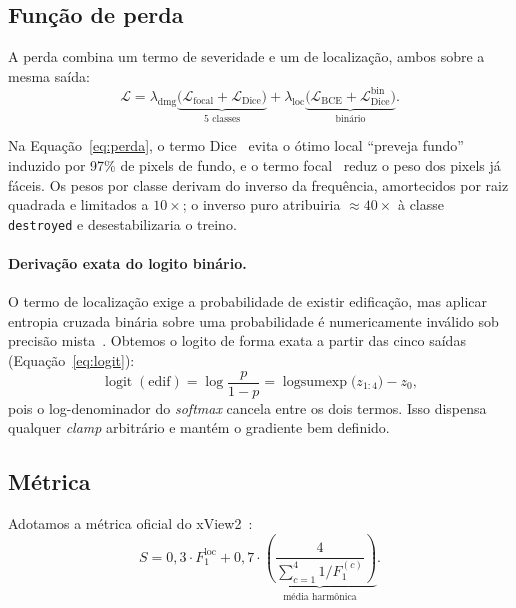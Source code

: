 \documentclass[11pt,a4paper]{article}
\begin{document}
\subsection{Função de perda}

A perda combina um termo de severidade e um de localização, ambos sobre a mesma
saída:
\begin{equation}
  \mathcal{L} = \lambda_{\text{dmg}}
      \underbrace{\big(\mathcal{L}_{\text{focal}} +
                       \mathcal{L}_{\text{Dice}}\big)}_{\text{5 classes}}
    + \lambda_{\text{loc}}
      \underbrace{\big(\mathcal{L}_{\text{BCE}} +
                       \mathcal{L}_{\text{Dice}}^{\text{bin}}\big)}_{\text{binário}} .
  \label{eq:perda}
\end{equation}

Na Equação~\ref{eq:perda}, o termo Dice~\cite{milletari2016} evita o ótimo local ``preveja fundo'' induzido
por 97\% de pixels de fundo, e o termo focal~\cite{lin2017focal} reduz o peso dos
pixels já fáceis. Os pesos por classe derivam do inverso da frequência,
amortecidos por raiz quadrada e limitados a $10\times$; o inverso puro atribuiria
$\approx 40\times$ à classe \texttt{destroyed} e desestabilizaria o treino.

\paragraph{Derivação exata do logito binário.} O termo de localização exige a
probabilidade de existir edificação, mas aplicar entropia cruzada binária sobre
uma probabilidade é numericamente inválido sob precisão mista~\cite{micikevicius2018}.
Obtemos o logito de forma exata a partir das cinco saídas (Equação~\ref{eq:logit}):
\begin{equation}
  \operatorname{logit}(\text{edif})
  = \log\frac{p}{1-p}
  = \operatorname{logsumexp}\big(z_{1:4}\big) - z_0 ,
  \label{eq:logit}
\end{equation}
pois o log-denominador do \emph{softmax} cancela entre os dois termos. Isso
dispensa qualquer \emph{clamp} arbitrário e mantém o gradiente bem definido.

\subsection{Métrica}

Adotamos a métrica oficial do xView2~\cite{xview2}:
\begin{equation}
  S = 0{,}3 \cdot F_1^{\text{loc}} + 0{,}7 \cdot
      \underbrace{\left(\frac{4}{\sum_{c=1}^{4} 1/F_1^{(c)}}\right)}_{\text{média harmônica}} .
  \label{eq:metrica}
\end{equation}
\end{document}
